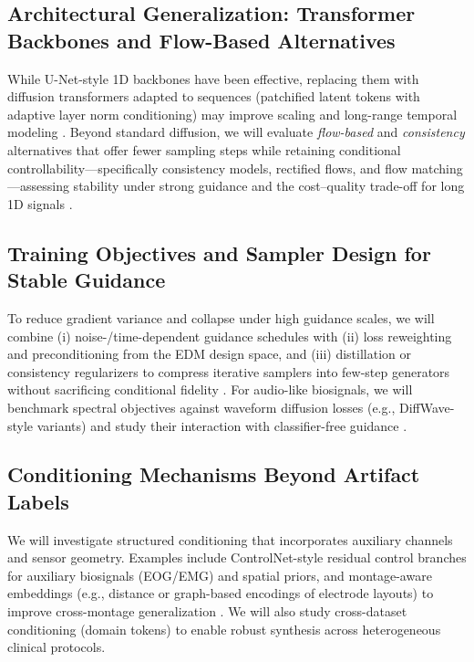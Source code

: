 \documentclass{article}
\begin{document}
\subsection{Architectural Generalization: Transformer Backbones and Flow-Based Alternatives}
While U-Net-style 1D backbones have been effective, replacing them with diffusion transformers adapted to sequences (patchified latent tokens with adaptive layer norm conditioning) may improve scaling and long-range temporal modeling \citep{peebles2023dit}. Beyond standard diffusion, we will evaluate \emph{flow-based} and \emph{consistency} alternatives that offer fewer sampling steps while retaining conditional controllability—specifically consistency models, rectified flows, and flow matching—assessing stability under strong guidance and the cost–quality trade-off for long 1D signals \citep{song2023consistency,liu2022rectifiedflow,lipman2022flowmatching}.

\subsection{Training Objectives and Sampler Design for Stable Guidance}
To reduce gradient variance and collapse under high guidance scales, we will combine (i) noise-/time-dependent guidance schedules with (ii) loss reweighting and preconditioning from the EDM design space, and (iii) distillation or consistency regularizers to compress iterative samplers into few-step generators without sacrificing conditional fidelity \citep{karras2022edm,nichol2021improved,salimans2022progressivedistill}. For audio-like biosignals, we will benchmark spectral objectives against waveform diffusion losses (e.g., DiffWave-style variants) and study their interaction with classifier-free guidance \citep{kong2020diffwave,ho2022cfg}.

\subsection{Conditioning Mechanisms Beyond Artifact Labels}
We will investigate structured conditioning that incorporates auxiliary channels and sensor geometry. Examples include ControlNet-style residual control branches for auxiliary biosignals (EOG/EMG) and spatial priors, and montage-aware embeddings (e.g., distance or graph-based encodings of electrode layouts) to improve cross-montage generalization \citep{zhang2023controlnet}. We will also study cross-dataset conditioning (domain tokens) to enable robust synthesis across heterogeneous clinical protocols.
\end{document}
